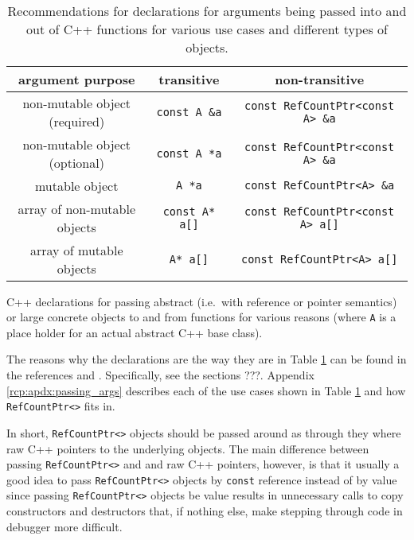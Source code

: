 \begin{table}
\begin{minipage}{{}\textwidth}
\end{minipage}
%
\\[5ex]
%
\begin{minipage}{{}\textwidth}
\begin{tabular}{|c|c|c|}
\hline
argument purpose
& transitive
& non-transitive \\
\hline
non-mutable object (required)
& {}\texttt{const A \&a}
& {}\texttt{const RefCountPtr<const A> \&a} \\
\hline
non-mutable object (optional)
& {}\texttt{const A *a}
& {}\texttt{const RefCountPtr<const A> \&a} \\
\hline
mutable object
& {}\texttt{A *a}
& {}\texttt{const RefCountPtr<A> \&a} \\
\hline
array of non-mutable objects
& {}\texttt{const A* a[]}
& {}\texttt{const RefCountPtr<const A> a[]} \\
\hline
array of mutable objects
& {}\texttt{A* a[]}
& {}\texttt{const RefCountPtr<A> a[]} \\
\hline
\end{tabular}
\begin{center}
C++ declarations for passing abstract (i.e.~with reference or pointer
semantics) or large concrete objects to and from functions for various
reasons (where {}\texttt{A} is a place holder for an actual abstract C++
base class).
\end{center}
\end{minipage}
%
\caption{\label{rcp:tbl:fnc-decl}
Recommendations for declarations for arguments being passed into and
out of C++ functions for various use cases and different types of
objects.}
%
\end{table}

The reasons why the declarations are the way they are in Table
{}\ref{rcp:tbl:fnc-decl} can be found in the references
{}\cite{ref:stroustrup_2000} and {}\cite{ref:meyers_1994}.
Specifically, see the sections ???.  Appendix
{}\ref{rcp:apdx:passing_args} describes each of the use cases shown in
Table {}{}\ref{rcp:tbl:fnc-decl} and how {}\texttt{RefCountPtr<>} fits
in.

In short, {}\texttt{RefCountPtr<>} objects should be passed around as
through they where raw C++ pointers to the underlying objects.  The
main difference between passing {}\texttt{RefCountPtr<>} and and raw
C++ pointers, however, is that it usually a good idea to pass
{}\texttt{RefCountPtr<>} objects by {}\texttt{const} reference instead
of by value since passing {}\texttt{RefCountPtr<>} objects be value
results in unnecessary calls to copy constructors and destructors
that, if nothing else, make stepping through code in debugger more
difficult.

